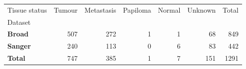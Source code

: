 \begin{tabular}{lrrrrrr}
\toprule
Tissue status & Tumour & Metastasis & Papiloma & Normal & Unknown & Total \\
Dataset &  &  &  &  &  &  \\
\midrule
\textbf{Broad} & 507 & 272 & 1 & 1 & 68 & 849 \\
\textbf{Sanger} & 240 & 113 & 0 & 6 & 83 & 442 \\
\textbf{Total} & 747 & 385 & 1 & 7 & 151 & 1291 \\
\bottomrule
\end{tabular}
